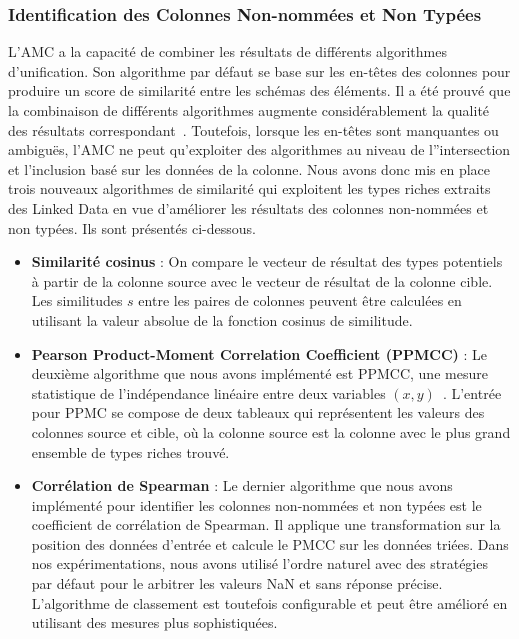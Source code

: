 \subsubsection{Identification des Colonnes Non-nomm\'{e}es et Non Typ\'{e}es}
L'AMC a la capacit\'{e} de combiner les r\'{e}sultats de diff\'{e}rents algorithmes d'unification. Son algorithme par d\'{e}faut se base sur les en-têtes des colonnes pour produire un score de similarit\'{e} entre les sch\'{e}mas des \'{e}l\'{e}ments. Il a \'{e}t\'{e} prouv\'{e} que la combinaison de diff\'{e}rents algorithmes augmente consid\'{e}rablement la qualit\'{e} des r\'{e}sultats correspondant~\cite{Peukert:ICDE:12}\cite{conf/wise/StracciaT05}. Toutefois, lorsque les en-têtes sont manquantes ou ambiguës, l'AMC ne peut qu'exploiter des algorithmes au niveau de l''intersection et l'inclusion bas\'{e} sur les donn\'{e}es de la colonne. Nous avons donc mis en place trois nouveaux algorithmes de similarit\'{e} qui exploitent les types riches extraits des Linked Data en vue d'am\'{e}liorer les r\'{e}sultats des colonnes non-nomm\'{e}es et non typ\'{e}es. Ils sont pr\'{e}sent\'{e}s ci-dessous.

\begin{itemize}
	\item \textbf{Similarit\'{e} cosinus} : On compare le vecteur de r\'{e}sultat des types potentiels à partir de la colonne source avec le vecteur de r\'{e}sultat de la colonne cible. Les similitudes $s$ entre les paires de colonnes peuvent être calcul\'{e}es en utilisant la valeur absolue de la fonction cosinus de similitude.
	\item \textbf{Pearson Product-Moment Correlation Coefficient (PPMCC)} : Le deuxi\`{e}me algorithme que nous avons impl\'{e}ment\'{e} est PPMCC, une mesure statistique de l'ind\'{e}pendance lin\'{e}aire entre deux variables $\left(x,y\right)$~\cite{Kowalski:RoyalStat:72}. L'entr\'{e}e pour PPMC se compose de deux tableaux qui repr\'{e}sentent les valeurs des colonnes source et cible, où la colonne source est la colonne avec le plus grand ensemble de types riches trouv\'{e}.
	\item \textbf{Corr\'{e}lation de Spearman} : Le dernier algorithme que nous avons impl\'{e}ment\'{e} pour identifier les colonnes non-nomm\'{e}es et non typ\'{e}es est le coefficient de corr\'{e}lation de Spearman. Il applique une transformation sur la position des donn\'{e}es d'entr\'{e}e et calcule le PMCC sur les donn\'{e}es tri\'{e}es. Dans nos exp\'{e}rimentations, nous avons utilis\'{e} l'ordre naturel avec des strat\'{e}gies par d\'{e}faut pour le arbitrer les valeurs NaN et sans r\'{e}ponse pr\'{e}cise. L'algorithme de classement est toutefois configurable et peut être am\'{e}lior\'{e} en utilisant des mesures plus sophistiqu\'{e}es.
\end{itemize}

